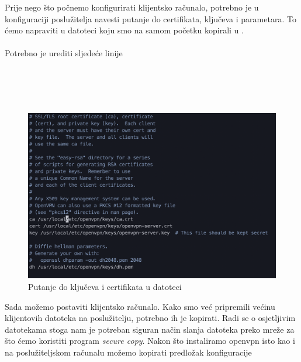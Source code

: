         \noindent
        Prije nego što počnemo konfigurirati klijentsko računalo, potrebno je u
        konfiguraciji poslužitelja navesti putanje do certifikata, ključeva i 
        parametara. To ćemo napraviti u datoteci  koju smo
        na samom početku kopirali u . \\
        
        \noindent
         \\
        
        \noindent
        Potrebno je urediti sljedeće linije \\

        \noindent
         \\
         \\
         \\
         \\ 

        \begin{figure}[H]
            \centering
            \includegraphics[scale=0.57]{slike/serverPaths}
            \caption{Putanje do ključeva i certifikata u datoteci
            }
        \end{figure}
        
        Sada možemo postaviti klijentsko računalo. Kako smo već pripremili
        većinu klijentovih datoteka na poslužitelju, potrebno ih je kopirati.
        Radi se o osjetljivim datotekama stoga nam je potreban siguran način
        slanja datoteka preko mreže za što ćemo koristiti program
        \textit{secure copy}. Nakon što instaliramo openvpn isto kao i na
        poslužiteljskom računalu možemo kopirati predložak konfiguracije \\

